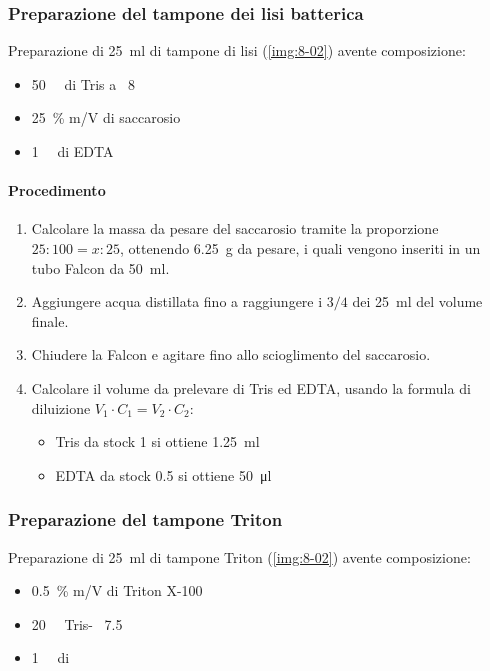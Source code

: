 \subsubsection{Preparazione del tampone dei lisi batterica}
\noindent Preparazione di \qty{25}{\ml} di tampone di lisi (\autoref{img:8-02}) avente composizione:
\begin{itemize}[person]
	\item \qty{50}{\milli\Molar} di Tris a \pH\ 8
	\item \qty{25}{\percent} m/V di saccarosio
	\item \qty{1}{\milli\Molar} di EDTA
\end{itemize}

\paragraph{Procedimento}
\begin{enumerate}
	\item Calcolare la massa da pesare del saccarosio tramite la proporzione \(25:100=x:25\), ottenendo \qty{6.25}{\g} da pesare, i quali vengono inseriti in un tubo Falcon da \qty{50}{\ml}.
	\item Aggiungere acqua distillata fino a raggiungere i \(3/4\) dei \qty{25}{\ml} del volume finale.
	\item Chiudere la Falcon e agitare fino allo scioglimento del saccarosio.
	\item Calcolare il volume da prelevare di Tris ed EDTA, usando la formula di diluizione \mbox{\(V_1\cdot C_1 = V_2\cdot C_2\)}:
	      \begin{itemize}[person]
		      \item Tris da stock \qty{1}{\Molar} si ottiene \qty{1.25}{\ml}
		      \item EDTA da stock \qty{0.5}{\Molar} si ottiene \qty{50}{\micro\litre}
	      \end{itemize}
\end{enumerate}

\subsubsection{Preparazione del tampone Triton}
\noindent Preparazione di \qty{25}{\ml} di tampone Triton (\autoref{img:8-02}) avente composizione:
\begin{itemize}[person]
	\item \qty{0.5}{\percent} m/V di Triton X-100
	\item \qty{20}{\milli\Molar} Tris- \pH\ \num{7.5}
	\item \qty{1}{\milli\Molar} di 
\end{itemize}


